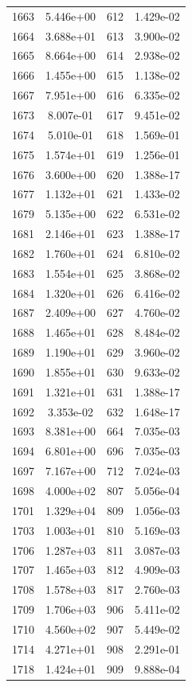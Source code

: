 \documentclass[12pt]{article}
\begin{document}
\begin{longtable}{@{}cccc@{}}
1663 & 5.446e+00 & 612 & 1.429e-02 \\
1664 & 3.688e+01 & 613 & 3.900e-02 \\
1665 & 8.664e+00 & 614 & 2.938e-02 \\
1666 & 1.455e+00 & 615 & 1.138e-02 \\
1667 & 7.951e+00 & 616 & 6.335e-02 \\
1673 & 8.007e-01 & 617 & 9.451e-02 \\
1674 & 5.010e-01 & 618 & 1.569e-01 \\
1675 & 1.574e+01 & 619 & 1.256e-01 \\
1676 & 3.600e+00 & 620 & 1.388e-17 \\
1677 & 1.132e+01 & 621 & 1.433e-02 \\
1679 & 5.135e+00 & 622 & 6.531e-02 \\
1681 & 2.146e+01 & 623 & 1.388e-17 \\
1682 & 1.760e+01 & 624 & 6.810e-02 \\
1683 & 1.554e+01 & 625 & 3.868e-02 \\
1684 & 1.320e+01 & 626 & 6.416e-02 \\
1687 & 2.409e+00 & 627 & 4.760e-02 \\
1688 & 1.465e+01 & 628 & 8.484e-02 \\
1689 & 1.190e+01 & 629 & 3.960e-02 \\
1690 & 1.855e+01 & 630 & 9.633e-02 \\
1691 & 1.321e+01 & 631 & 1.388e-17 \\
1692 & 3.353e-02 & 632 & 1.648e-17 \\
1693 & 8.381e+00 & 664 & 7.035e-03 \\
1694 & 6.801e+00 & 696 & 7.035e-03 \\
1697 & 7.167e+00 & 712 & 7.024e-03 \\
1698 & 4.000e+02 & 807 & 5.056e-04 \\
1701 & 1.329e+04 & 809 & 1.056e-03 \\
1703 & 1.003e+01 & 810 & 5.169e-03 \\
1706 & 1.287e+03 & 811 & 3.087e-03 \\
1707 & 1.465e+03 & 812 & 4.909e-03 \\
1708 & 1.578e+03 & 817 & 2.760e-03 \\
1709 & 1.706e+03 & 906 & 5.411e-02 \\
1710 & 4.560e+02 & 907 & 5.449e-02 \\
1714 & 4.271e+01 & 908 & 2.291e-01 \\
1718 & 1.424e+01 & 909 & 9.888e-04 \\

\end{longtable}
\end{document}
